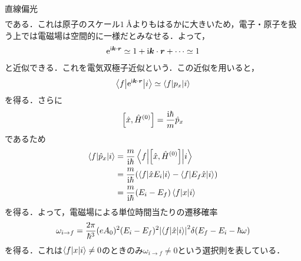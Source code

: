 \documentclass{report}
\begin{document}
\begin{myex}{直線偏光}{}
\begin{align}
    \end{align}
    である．これは原子のスケール$1\ \si{\angstrom}$よりもはるかに大きいため，電子・原子を扱う上では電磁場は空間的に一様だとみなせる．よって，
    \begin{align}
      \mathrm{e}^{\mathrm{i}\bm{k}\cdot\bm{r}}\simeq 1 + \mathrm{i} \bm{k} \cdot \bm{r} + \cdots \simeq 1
    \end{align}
    と近似できる．これを電気双極子近似という．この近似を用いると，
    \begin{align}
      \mel**{f}{\mathrm{e}^{\mathrm{i} \bm{k} \cdot \bm{r}}}{{i}} \simeq \mel**{f}{p_x}{i}
    \end{align}
    を得る．さらに
    \begin{align}
      \qty[\hat{x}, \hat{H}^{(0)}] = \frac{\mathrm{i} \hbar}{m}\hat{p}_x
    \end{align}
    であるため
    \begin{align}
      \mel**{f}{\hat{p}_x}{i} &= \frac{m}{\mathrm{i}\hbar} \mel**{f}{\qty[\hat{x}, \hat{H}^{(0)}]}{i} \\ 
      &= \frac{m}{\mathrm{i}\hbar} \qty(\mel**{f}{\hat{x}E_i}{i} - \mel**{f}{E_f\hat{x}}{i}) \\ 
      &= \frac{m}{\mathrm{i}\hbar} (E_i - E_f)\mel**{f}{x}{i}
    \end{align}
    を得る．よって，電磁場による単位時間当たりの遷移確率
    \begin{align}
      \omega_{i \to f} = \frac{2\pi}{\hbar^3} (eA_0)^2 (E_i - E_f)^2 \abs{\mel**{f}{\hat{x}}{i}}^2 \delta(E_f - E_i - \hbar\omega) 
    \end{align}
    を得る．これは$\mel**{f}{x}{i} \neq 0$のときのみ$\omega_{i\to f} \neq 0$という選択則を表している．
  \end{myex}
\end{document}
